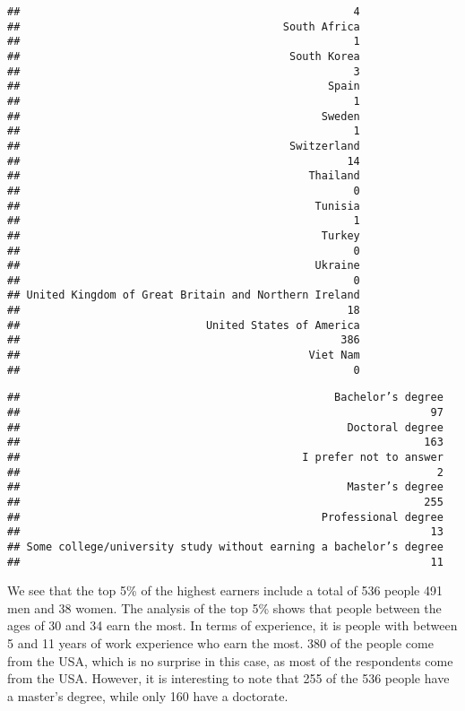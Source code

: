 \documentclass[
]{article}
\begin{document}
\begin{verbatim}
##                                                    4 
##                                         South Africa 
##                                                    1 
##                                          South Korea 
##                                                    3 
##                                                Spain 
##                                                    1 
##                                               Sweden 
##                                                    1 
##                                          Switzerland 
##                                                   14 
##                                             Thailand 
##                                                    0 
##                                              Tunisia 
##                                                    1 
##                                               Turkey 
##                                                    0 
##                                              Ukraine 
##                                                    0 
## United Kingdom of Great Britain and Northern Ireland 
##                                                   18 
##                             United States of America 
##                                                  386 
##                                             Viet Nam 
##                                                    0
\end{verbatim}

\begin{verbatim}
##                                                 Bachelor’s degree 
##                                                                97 
##                                                   Doctoral degree 
##                                                               163 
##                                            I prefer not to answer 
##                                                                 2 
##                                                   Master’s degree 
##                                                               255 
##                                               Professional degree 
##                                                                13 
## Some college/university study without earning a bachelor’s degree 
##                                                                11
\end{verbatim}

We see that the top 5\% of the highest earners include a total of 536
people 491 men and 38 women. The analysis of the top 5\% shows that
people between the ages of 30 and 34 earn the most. In terms of
experience, it is people with between 5 and 11 years of work experience
who earn the most. 380 of the people come from the USA, which is no
surprise in this case, as most of the respondents come from the USA.
However, it is interesting to note that 255 of the 536 people have a
master's degree, while only 160 have a doctorate.
\end{document}
